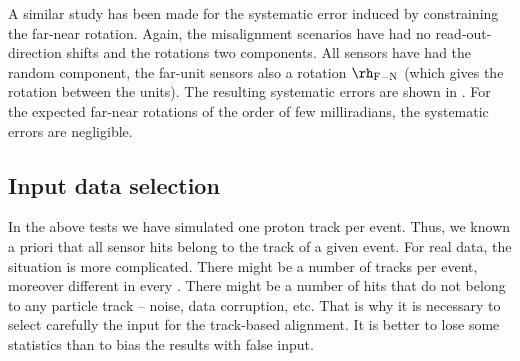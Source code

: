 
A similar study has been made for the systematic error induced by constraining the far-near rotation. Again, the misalignment scenarios have had no read-out-direction shifts and the rotations two components. All sensors have had the random component, the far-unit sensors also a rotation $\rh_{\rm F-N}$ (which gives the rotation between the units). The resulting systematic errors are shown in . For the expected far-near rotations of the order of few milliradians, the systematic errors are negligible.


\eject %
\subsection[al data sel]{Input data selection}

In the above  tests we have simulated one proton track per event. Thus, we known a priori that all sensor hits belong to the track of a given event. For real  data, the situation is more complicated. There might be a number of tracks per event, moreover different in every . There might be a number of hits that do not belong to any particle track -- noise, data corruption, etc. That is why it is necessary to select carefully the input for the track-based alignment. It is better to lose some statistics than to bias the results with false input.

